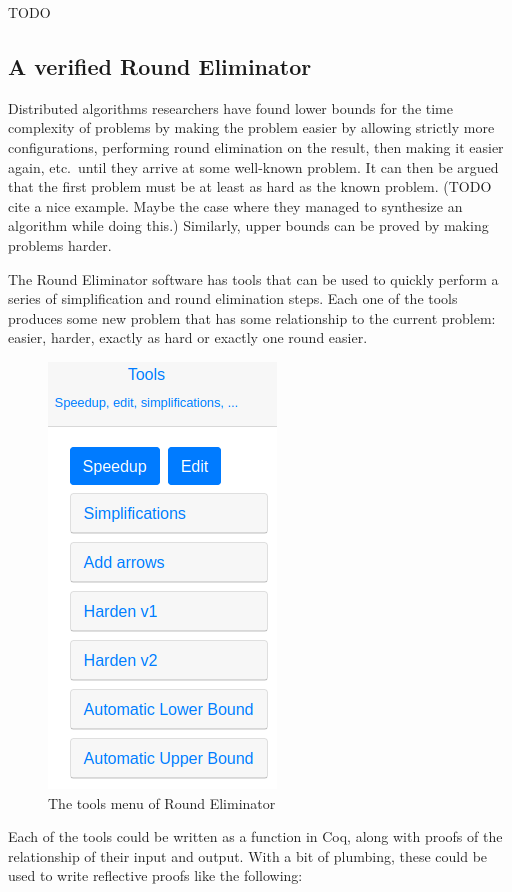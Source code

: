 \documentclass[english, 12pt, a4paper, sci, a-1b, online]{aaltothesis}
\begin{document}
TODO

\subsection{A verified Round Eliminator}

Distributed algorithms researchers have found lower bounds for the time complexity of problems by making the problem easier by allowing strictly more configurations, performing round elimination on the result, then making it easier again, etc.\ until they arrive at some well-known problem. It can then be argued that the first problem must be at least as hard as the known problem. (TODO cite a nice example. Maybe the case where they managed to synthesize an algorithm while doing this.) Similarly, upper bounds can be proved by making problems harder.

The Round Eliminator software has tools that can be used to quickly perform a series of simplification and round elimination steps. Each one of the tools produces some new problem that has some relationship to the current problem: easier, harder, exactly as hard or exactly one round easier.

\begin{figure}[h]
  \centering
  \includegraphics[scale=0.5]{retools}
  \caption{The tools menu of Round Eliminator}
\end{figure}

Each of the tools could be written as a function in Coq, along with proofs of the relationship of their input and output. With a bit of plumbing, these could be used to write reflective proofs like the following:
\end{document}
